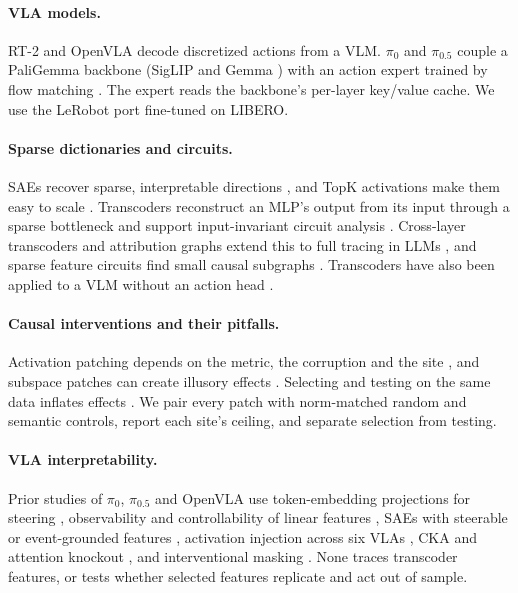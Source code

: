 \documentclass{article} %
\newcommand{\pifive}{$\pi_{0.5}$}
\begin{document}
\paragraph{VLA models.} RT-2 \citep{brohan2023rt2} and OpenVLA \citep{kim2024openvla} decode discretized actions from a VLM. $\pi_0$ \citep{black2024pi0} and \pifive{} \citep{pi2025pi05} couple a PaliGemma backbone \citep{beyer2024paligemma} (SigLIP \citep{zhai2023siglip} and Gemma \citep{gemma2024}) with an action expert trained by flow matching \citep{lipman2023flow}. The expert reads the backbone's per-layer key/value cache. We use the LeRobot port \citep{cadene2024lerobot} fine-tuned on LIBERO.

\paragraph{Sparse dictionaries and circuits.} SAEs recover sparse, interpretable directions \citep{bricken2023monosemanticity,cunningham2024sparse}, and TopK activations make them easy to scale \citep{gao2025scaling}. Transcoders reconstruct an MLP's output from its input through a sparse bottleneck and support input-invariant circuit analysis \citep{dunefsky2024transcoders}. Cross-layer transcoders and attribution graphs extend this to full tracing in LLMs \citep{ameisen2025circuit,lindsey2025biology}, and sparse feature circuits find small causal subgraphs \citep{marks2025sparse}. Transcoders have also been applied to a VLM without an action head \citep{damianos2026transcoders}.

\paragraph{Causal interventions and their pitfalls.} Activation patching \citep{meng2022locating,wang2023interpretability} depends on the metric, the corruption and the site \citep{zhang2024towards,heimersheim2024patching}, and subspace patches can create illusory effects \citep{makelov2024subspace}. Selecting and testing on the same data inflates effects \citep{kriegeskorte2009circular}. We pair every patch with norm-matched random and semantic controls, report each site's ceiling, and separate selection from testing.

\paragraph{VLA interpretability.} Prior studies of $\pi_0$, \pifive{} and OpenVLA use token-embedding projections for steering \citep{haon2025mechanistic}, observability and controllability of linear features \citep{buurmeijer2026observing}, SAEs with steerable or event-grounded features \citep{swann2026sparse,jin2026event}, activation injection across six VLAs \citep{grant2026features}, CKA and attention knockout \citep{shi2026vlatrace}, and interventional masking \citep{zhang2026embodied}. None traces transcoder features, or tests whether selected features replicate and act out of sample.
\end{document}
